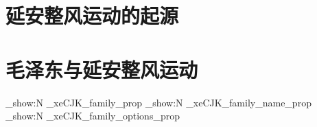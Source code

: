 \documentclass{GaoHua}
\begin{document}
\frontmatter


\tableofcontents

\mainmatter

\part{延安整风运动的起源}


\part{毛泽东与延安整风运动}


\backmatter


\ExplSyntaxOn

\prop_show:N \g_xeCJK_family_prop
\prop_show:N \g_xeCJK_family_name_prop
\prop_show:N \g_xeCJK_family_options_prop

\ExplSyntaxOff
\end{document}
